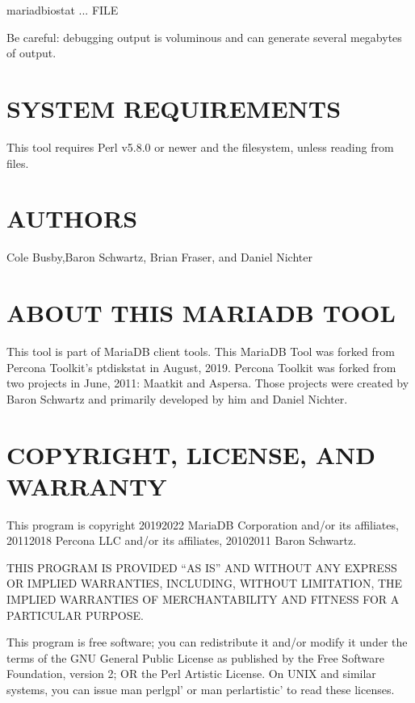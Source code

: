 \documentclass[letterpaper,10pt,english]{sphinxmanual}
\begin{document}
\begin{sphinxVerbatim}[commandchars=\\\{\}]
 mariadb\PYGZhy{}iostat ... \PYGZgt{} FILE \PYGZgt{}
\end{sphinxVerbatim}

Be careful: debugging output is voluminous and can generate several megabytes
of output.


\section{SYSTEM REQUIREMENTS}
\label{\detokenize{mariadb-iostat:system-requirements}}
This tool requires Perl v5.8.0 or newer and the  filesystem, unless
reading from files.


\section{AUTHORS}
\label{\detokenize{mariadb-iostat:authors}}
Cole Busby,Baron Schwartz, Brian Fraser, and Daniel Nichter


\section{ABOUT THIS MARIADB TOOL}
\label{\detokenize{mariadb-iostat:about-this-mariadb-tool}}
This tool is part of MariaDB client tools. This MariaDB Tool was forked from
Percona Toolkit’s pt\sphinxhyphen{}diskstat in August, 2019. Percona Toolkit was forked from two
projects in June, 2011: Maatkit and Aspersa.  Those projects were created by
Baron Schwartz and primarily developed by him and Daniel Nichter.


\section{COPYRIGHT, LICENSE, AND WARRANTY}
\label{\detokenize{mariadb-iostat:copyright-license-and-warranty}}
This program is copyright 2019\sphinxhyphen{}2022 MariaDB Corporation and/or its affiliates,
2011\sphinxhyphen{}2018 Percona LLC and/or its affiliates, 2010\sphinxhyphen{}2011 Baron Schwartz.

THIS PROGRAM IS PROVIDED “AS IS” AND WITHOUT ANY EXPRESS OR IMPLIED
WARRANTIES, INCLUDING, WITHOUT LIMITATION, THE IMPLIED WARRANTIES OF
MERCHANTABILITY AND FITNESS FOR A PARTICULAR PURPOSE.

This program is free software; you can redistribute it and/or modify it under
the terms of the GNU General Public License as published by the Free Software
Foundation, version 2; OR the Perl Artistic License.  On UNIX and similar
systems, you can issue \textasciigrave{}man perlgpl’ or \textasciigrave{}man perlartistic’ to read these
licenses.
\end{document}

